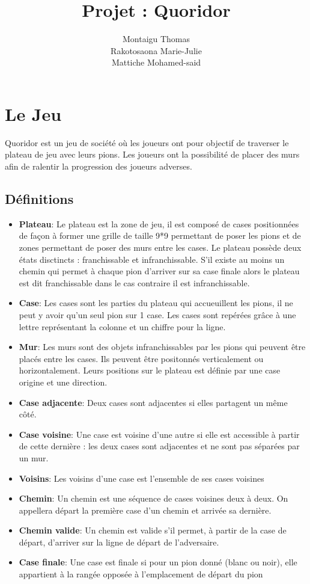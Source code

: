 \documentclass[a4paper, draft]{article}
\title{Projet : Quoridor}
\author{Montaigu Thomas \\ Rakotosaona Marie-Julie \\ Mattiche Mohamed-said}
\begin{document}
\maketitle

\newpage
\tableofcontents
\newpage

\section{Le Jeu}
Quoridor est un jeu de société où les joueurs ont pour objectif de traverser  le plateau de jeu avec leurs pions. Les joueurs ont la possibilité de placer des murs afin de ralentir la progression des joueurs adverses.

\subsection{Définitions}

\begin{itemize}

\item \textbf{Plateau}: Le plateau est la zone de jeu, il est composé de cases positionnées de façon à former une grille  de taille 9*9 permettant de poser les pions et de zones permettant de poser des murs entre les cases. Le plateau possède deux états disctincts : franchissable et infranchissable. S'il existe au moins un chemin qui permet à chaque pion d'arriver sur sa case finale alors le plateau est dit franchissable dans le cas contraire il est infranchissable. 


\item \textbf{Case}: Les cases sont les parties du plateau qui accueuillent les pions, il ne peut y avoir qu'un seul pion sur 1 case.
Les cases sont repérées grâce à une lettre représentant la colonne et un chiffre pour la ligne.


\item \textbf{Mur}: Les murs sont des objets infranchissables par les pions qui peuvent être placés entre les cases. Ils peuvent être positonnés verticalement ou horizontalement. Leurs positions sur le plateau est définie par une case origine  et une direction.
\item \textbf{Case adjacente}: Deux cases sont adjacentes si elles partagent un même côté.
\item \textbf{Case voisine}: Une case est voisine d'une autre si elle est accessible à partir de cette dernière : les deux cases sont adjacentes et ne sont pas séparées par un mur.
\item \textbf{Voisins}: Les voisins d'une case est l'ensemble de ses cases voisines
\item \textbf{Chemin}: Un chemin est une séquence de cases voisines deux à deux. On appellera départ la première case d'un chemin et arrivée sa dernière.
\item \textbf{Chemin valide}: Un chemin est valide s'il permet, à partir de la case de départ, d'arriver sur la ligne de départ de l'adversaire. 
\item \textbf{Case finale}: Une case est finale si pour un pion donné (blanc ou noir), elle appartient à la rangée opposée à l'emplacement de départ du pion 
\end{itemize}
\end{document}
